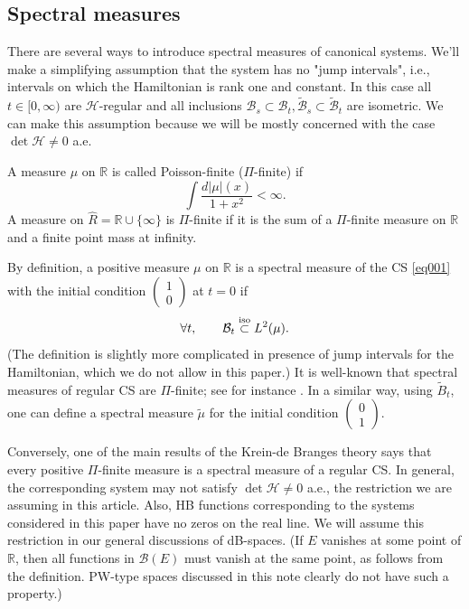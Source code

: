 \documentclass[11pt,twoside,reqno]{amsart}
\def\ti{\tilde}
\def\ms{\bigskip}
\def\ms{\medskip}
\def\R{{\mathbb R}}
\def\BB{{\mathcal B}}
\def\HH{{\mathcal H}}
\theoremstyle{plain}
\numberwithin{equation}{section}
\begin{document}
\ms \subsection{Spectral measures}\label{secSM} There are several ways to introduce spectral measures of canonical systems. We'll make a simplifying assumption that the system has no "jump intervals", i.e., intervals on which the Hamiltonian is rank one and constant. In this case all $t\in [0,\infty)$ are
$\HH$-regular and all inclusions $\BB_s\subset\BB_t, \ti\BB_s\subset\ti\BB_t$
are isometric.
We can make this assumption because we will be mostly concerned with the case $\det\HH\neq 0$ a.e.





A  measure $\mu$ on $\R$ is called Poisson-finite ($\Pi$-finite) if  $$\int\frac{d|\mu|(x)}{1+x^2}<\infty.$$
A measure on $\hat R=\R\cup \{\infty\}$ is $\Pi$-finite if it is the sum of a $\Pi$-finite measure on $\R$ and a finite point mass at infinity.



By definition, a positive measure $\mu$ on $\R$ is a spectral measure of the CS \eqref{eq001} with the initial condition $\begin{pmatrix}1\\0\end{pmatrix}$ at $t=0$ if
$$\forall t,\qquad \BB_t\stackrel{\rm iso}{\subset} L^2(\mu).$$
(The definition is slightly more complicated in presence of jump intervals for the Hamiltonian, which we do not allow in this paper.)
It is well-known that spectral measures of regular CS are $\Pi$-finite; see for instance \cite{Rem}. In a similar way, using $\ti B_t$, one can define a spectral measure
$\ti \mu$ for the initial condition  $\begin{pmatrix}0\\1\end{pmatrix}$. 

Conversely, one of the main results of the Krein-de Branges theory says that every positive $\Pi$-finite
measure is a spectral measure of a regular CS. In general, the corresponding system may not satisfy $\det \HH\neq 0$ a.e., the restriction we are assuming in this article. Also,
HB functions corresponding to the systems considered in this paper have no zeros on the
real line. We will assume this restriction in our general
discussions of dB-spaces. (If $E$ vanishes at some point of $\R$, then all functions in $\BB(E)$ must vanish at the same point, as follows from the definition. PW-type spaces discussed in this note clearly do not have such a property.)
\end{document}
